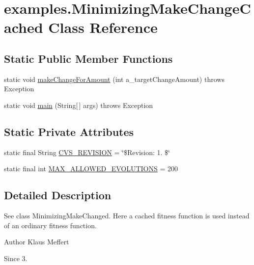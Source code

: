 \hypertarget{classexamples_1_1_minimizing_make_change_cached}{\section{examples.\-Minimizing\-Make\-Change\-Cached Class Reference}
\label{classexamples_1_1_minimizing_make_change_cached}
}
\subsection*{Static Public Member Functions}
\begin{DoxyCompactItemize}
\item 
static void \hyperlink{classexamples_1_1_minimizing_make_change_cached_a0563ae870981869a14e2fb1ead3446b6}{make\-Change\-For\-Amount} (int a\-\_\-target\-Change\-Amount)  throws Exception 
\item 
static void \hyperlink{classexamples_1_1_minimizing_make_change_cached_a22d60345377184575b1bb8de4cbfb53e}{main} (String\mbox{[}$\,$\mbox{]} args)  throws Exception 
\end{DoxyCompactItemize}
\subsection*{Static Private Attributes}
\begin{DoxyCompactItemize}
\item 
static final String \hyperlink{classexamples_1_1_minimizing_make_change_cached_a45708be5ccb1c5758ad866c6eda6e9b2}{C\-V\-S\-\_\-\-R\-E\-V\-I\-S\-I\-O\-N} = \char`\"{}\$Revision\-: 1. \$\char`\"{}
\item 
static final int \hyperlink{classexamples_1_1_minimizing_make_change_cached_a9ba370739f88cda7103ad16aa1792f16}{M\-A\-X\-\_\-\-A\-L\-L\-O\-W\-E\-D\-\_\-\-E\-V\-O\-L\-U\-T\-I\-O\-N\-S} = 200
\end{DoxyCompactItemize}


\subsection{Detailed Description}
See class Minimizing\-Make\-Changed. Here a cached fitness function is used instead of an ordinary fitness function.

\begin{DoxyAuthor}{Author}
Klaus Meffert 
\end{DoxyAuthor}
\begin{DoxySince}{Since}
3. 
\end{DoxySince}


